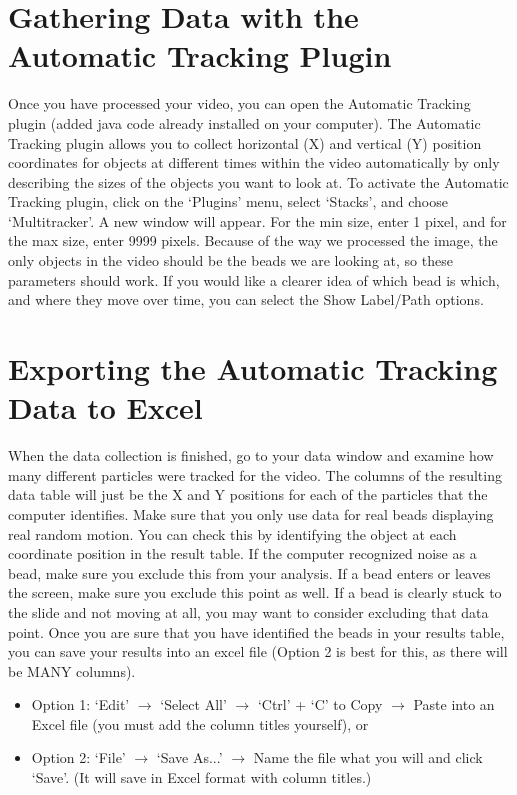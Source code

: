 \section*{Gathering Data with the Automatic Tracking Plugin}
Once you have processed your video, you can open the Automatic Tracking plugin (added java code already installed on your computer). 
The Automatic Tracking plugin allows you to collect horizontal (X) and vertical (Y) position coordinates for objects at different times within the video automatically by only describing the sizes of the objects you want to look at. 
To activate the Automatic Tracking plugin, click on the `Plugins' menu, select `Stacks', and choose `Multitracker'. 
A new window will appear. 
For the min size, enter 1 pixel, and for the max size, enter 9999 pixels. 
Because of the way we processed the image, the only objects in the video should be the beads we are looking at, so these parameters should work. 
If you would like a clearer idea of which bead is which, and where they move over time, you can select the Show Label/Path options.
\section*{Exporting the Automatic Tracking Data to Excel}
When the data collection is finished, go to your data window and examine how many different particles were tracked for the video. 
The columns of the resulting data table will just be the X and Y positions for each of the particles that the computer identifies. 
Make sure that you only use data for real beads displaying real random motion. 
You can check this by identifying the object at each coordinate position in the result table. 
If the computer recognized noise as a bead, make sure you exclude this from your analysis. 
If a bead enters or leaves the screen, make sure you exclude this point as well. 
If a bead is clearly stuck to the slide and not moving at all, you may want to consider excluding that data point. 
Once you are sure that you have identified the beads in your results table, you can save your results into an excel file (Option 2 is best for this, as there will be MANY columns).
\begin{itemize}
\item Option 1: `Edit' $\rightarrow$ `Select All' $\rightarrow$ `Ctrl' + `C' to Copy $\rightarrow$ Paste into an Excel file (you must add the column titles yourself), or
\item Option 2: `File' $\rightarrow$ `Save As...' $\rightarrow$ Name the file what you will and click `Save'. (It will save in Excel format with column titles.)
\end{itemize}